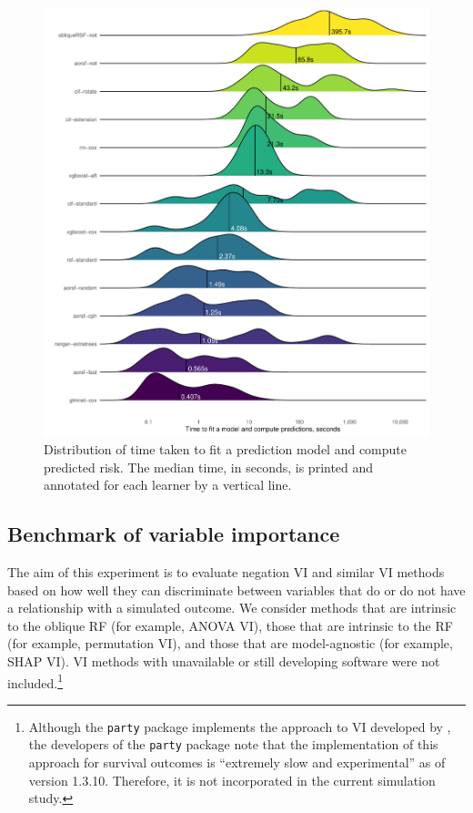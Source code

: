 \documentclass{article}\usepackage[]{graphicx}\usepackage[]{xcolor}
\makeatletter
\def\maxwidth{ %
  \ifdim\Gin@nat@width>\linewidth
    \linewidth
  \else
    \Gin@nat@width
  \fi
}
\newenvironment{knitrout}{}{} %
\newcommand{\eg}{for example}
\makeatother
\begin{document}
\begin{knitrout}
\color{fgcolor}\begin{figure}
\includegraphics[width=\maxwidth]{figure/bm_pred_time-1} \caption[Distribution of time taken to fit a prediction model and compute predicted risk]{Distribution of time taken to fit a prediction model and compute predicted risk. The median time, in seconds, is printed and annotated for each learner by a vertical line.}\label{fig:bm_pred_time}
\end{figure}

\end{knitrout}


\subsection{Benchmark of variable importance} \label{sec:bm_vi}

The aim of this experiment is to evaluate negation VI and similar VI methods based on how well they can discriminate between variables that do or do not have a relationship with a simulated outcome. We consider methods that are intrinsic to the oblique RF (\eg, ANOVA VI), those that are intrinsic to the RF (\eg, permutation VI), and those that are model-agnostic (\eg, SHAP VI). VI methods with unavailable or still developing software were not included.\footnote{Although the \texttt{party} package implements the approach to VI developed by \citet{strobl2007bias}, the developers of the \texttt{party} package note that the implementation of this approach for survival outcomes is ``extremely slow and experimental'' as of version 1.3.10. Therefore, it is not incorporated in the current simulation study.}
\end{document}
